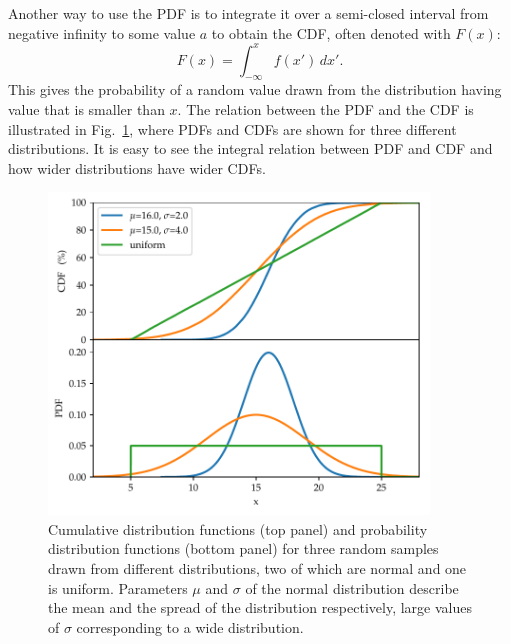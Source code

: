 \documentclass[english, twoside]{HYgradu}
\begin{document}
Another way to use the PDF is to integrate it over a semi-closed interval from negative infinity to some value $a$ to obtain the CDF, often denoted with $F(x)$:
\begin{equation}
	F(x) = \int_{-\infty}^x f(x') \,dx'.
\end{equation}	
This gives the probability of a random value drawn from the distribution having value that is smaller than $x$. The relation between the PDF and the CDF is illustrated in Fig.\ \ref{fig:cdf}, where PDFs and CDFs are shown for three different distributions. It is easy to see the integral relation between PDF and CDF and how wider distributions have wider CDFs. \citep{htk}

\begin{figure}
   \centering
   \includegraphics[width=0.9\textwidth]{kuvat/cdf.pdf}
   \caption{Cumulative distribution functions (top panel) and probability distribution functions (bottom panel) for three random samples drawn from different distributions, two of which are normal and one is uniform. Parameters $\mu$ and $\sigma$ of the normal distribution describe the mean and the spread of the distribution respectively, large values of $\sigma$ corresponding to a wide distribution.}
   \label{fig:cdf}

\end{figure}
\end{document}
